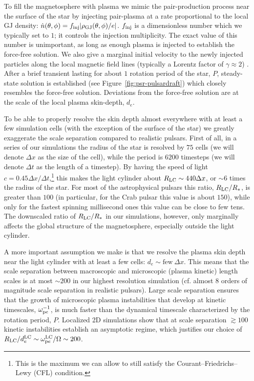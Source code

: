 To fill the magnetosphere with plasma we mimic the pair-production process near the surface of the star by injecting pair-plasma at a rate proportional to the local GJ density: $\dot{n}(\theta,\phi) = f_{\rm inj}|\rho_{\rm GJ}(\theta,\phi) / e|$. $f_{\rm inj}$ is a dimensionless number which we typically set to $1$; it controls the injection multiplicity. The exact value of this number is unimportant, as long as enough plasma is injected to establish the force-free solution. We also give a marginal initial velocity to the newly injected particles along the local magnetic field lines  (typically a Lorentz factor of $\gamma\approx 2$) \citep[similar technique has been previously used by][]{2015MNRAS.448..606C, 2015MNRAS.449.2759B}. After a brief transient lasting for about $1$ rotation period of the star, $P$, steady-state solution is established (see Figure~\ref{fig:psr-pulsardraft}) which closely resembles the force-free solution. Deviations from the force-free solution are at the scale of the local plasma skin-depth, $d_{e}$. 

To be able to properly resolve the skin depth almost everywhere with at least a few simulation cells (with the exception of the surface of the star) we greatly exaggerate the scale separation compared to realistic pulsars. First of all, in a series of our simulations the radius of the star is resolved by $75$ cells (we will denote $\Delta x$ as the size of the cell), while the period is $6200$ timesteps (we will denote $\Delta t$ as the length of a timestep). By having the speed of light $c=0.45\Delta x/\Delta t$,\footnote{This is the maximum we can allow to still satisfy the Courant–Friedrichs–Lewy (CFL) condition.} this makes the light cylinder about $R_{\rm LC}\sim 440\Delta x$, or $\sim 6$ times the radius of the star. For most of the astrophysical pulsars this ratio, $R_{\rm LC}/R_*$, is greater than $100$ (in particular, for the Crab pulsar this value is about $150$), while only for the fastest spinning millisecond ones this value can be close to few tens. The downscaled ratio of $R_{\rm LC}/R_*$ in our simulations, however, only marginally affects the global structure of the magnetosphere, especially outside the light cylinder. 

A more important assumption we make is that we resolve the plasma skin depth near the light cylinder with at least a few cells: $d_e\sim \text{few}~\Delta x$. This means that the scale separation between macroscopic and microscopic (plasma kinetic) length scales is at most $\sim200$ in our highest resolution simulation (cf. almost $8$ orders of magnitude scale separation in realistic pulsars). Large scale separation ensures that the growth of microscopic plasma instabilities that develop at kinetic timescales, $\omega_{{\rm p}e}^{-1}$, is much faster than the dynamical timescale characterized by the rotation period, $P$. Localized 2D simulations \citep[see, e.g.,][]{2016ApJ...816L...8W} show that at scale separation $\gtrsim 100$ kinetic instabilities establish an asymptotic regime, which justifies our choice of $R_{\rm LC} / d_e^{\rm LC} \sim \omega_{{\rm p}e}^{\rm LC}/\Omega \sim 200$. 


